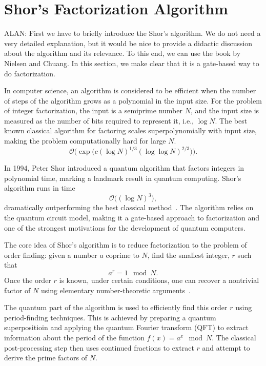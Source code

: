 \section{Shor's Factorization Algorithm}

{\color{blue} ALAN: First we have to briefly introduce the Shor's algorithm. We do not need a
very detailed explanation, but it would be nice to provide a didactic discussion about the algorithm
and its relevance. To this end, we can use the book by Nielsen and Chuang. In this section,
we make clear that it is a gate-based way to do factorization.}

In computer science, an algorithm is considered to be efficient when the number of steps
of the algorithm grows as a polynomial in the input size. For the problem of integer factorization,
the input is a semiprime number $N$, and the input size is measured as the number of bits
required to represent it, i.e., $\log N$. The best known classical algorithm for factoring
scales superpolynomially with input size, making the problem computationally hard for large $N$.
\begin{equation}
    \mathcal{O} \bigg( \exp \big( c(\log N)^{1/3} (\log \log N)^{2/3} \big) \bigg).
    \label{eq:field_sieve_scaling}
\end{equation}

In 1994, Peter Shor introduced a quantum algorithm that factors integers in polynomial time,
marking a landmark result in quantum computing. Shor's algorithm runs in time
\begin{equation}
    \mathcal{O} \big( (\log N)^3 \big),
    \label{eq:shor_scaling}
\end{equation}
dramatically outperforming the best classical method~\cite{nielsen00}. The algorithm relies on the quantum
circuit model, making it a gate-based approach to factorization and one of the strongest motivations
for the development of quantum computers.

The core idea of Shor's algorithm is to reduce factorization to the problem of order finding:
given a number $a$ coprime to $N$, find the smallest integer, $r$ such that
\begin{equation}
    a^r = 1 \mod N.
    \label{eq:order_finding}
\end{equation}
Once the order $r$ is known, under certain conditions, one can recover a nontrivial factor of
$N$ using elementary number-theoretic arguments~\cite{nielsen00}.

The quantum part of the algorithm is used to efficiently find this order $r$ using
period-finding techniques. This is achieved by preparing a quantum superpositioin and applying the
quantum Fourier transform (QFT) to extract information about the period of the function
$f(x) = a^x \mod N$. The classical post-processing step then uses continued fractions to extract $r$
and attempt to derive the prime factors of $N$.

